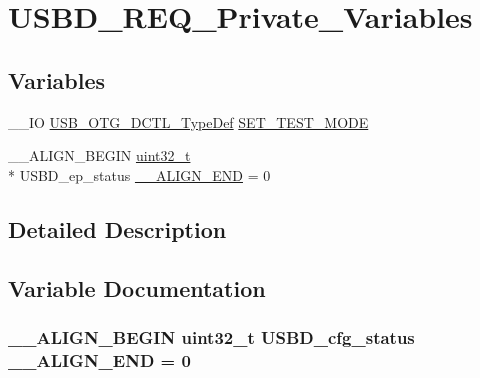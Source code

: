 \hypertarget{group___u_s_b_d___r_e_q___private___variables}{\section{U\-S\-B\-D\-\_\-\-R\-E\-Q\-\_\-\-Private\-\_\-\-Variables}
\label{group___u_s_b_d___r_e_q___private___variables}
}
\subsection*{Variables}
\begin{DoxyCompactItemize}
\item 
\-\_\-\-\_\-\-I\-O \hyperlink{group______otg___core__registers_ga6aab28e2f9b33185c7de34376313c69c}{U\-S\-B\-\_\-\-O\-T\-G\-\_\-\-D\-C\-T\-L\-\_\-\-Type\-Def} \hyperlink{group___u_s_b_d___r_e_q___private___variables_ga77158fc4ea7f97962188de180f2d3b71}{S\-E\-T\-\_\-\-T\-E\-S\-T\-\_\-\-M\-O\-D\-E}
\item 
\-\_\-\-\_\-\-A\-L\-I\-G\-N\-\_\-\-B\-E\-G\-I\-N \hyperlink{stdint_8h_a435d1572bf3f880d55459d9805097f62}{uint32\-\_\-t} \\*
U\-S\-B\-D\-\_\-ep\-\_\-status \hyperlink{group___u_s_b_d___r_e_q___private___variables_gad76d4ecf3c5212f875ad651ddea36a35}{\-\_\-\-\_\-\-A\-L\-I\-G\-N\-\_\-\-E\-N\-D} = 0
\end{DoxyCompactItemize}


\subsection{Detailed Description}


\subsection{Variable Documentation}
\hypertarget{group___u_s_b_d___r_e_q___private___variables_gad76d4ecf3c5212f875ad651ddea36a35}{
\subsubsection[{\-\_\-\-\_\-\-A\-L\-I\-G\-N\-\_\-\-E\-N\-D}]{\setlength{\rightskip}{0pt plus 5cm}\-\_\-\-\_\-\-A\-L\-I\-G\-N\-\_\-\-B\-E\-G\-I\-N {\bf uint32\-\_\-t} U\-S\-B\-D\-\_\-cfg\-\_\-status \-\_\-\-\_\-\-A\-L\-I\-G\-N\-\_\-\-E\-N\-D = 0}}\label{group___u_s_b_d___r_e_q___private___variables_gad76d4ecf3c5212f875ad651ddea36a35}



